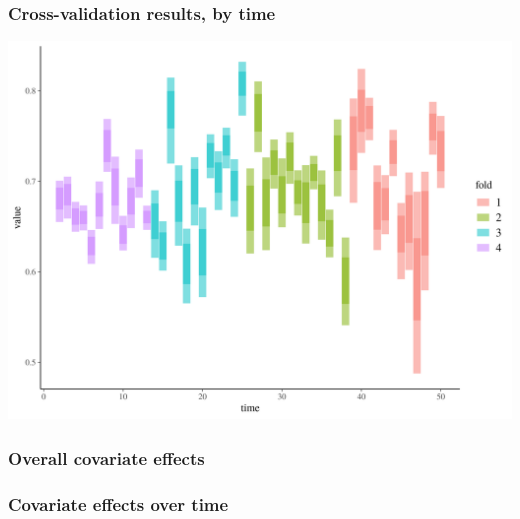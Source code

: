 \documentclass{beamer}
\begin{document}
\begin{frame}
  \frametitle{Cross-validation results, by time}
  
  \includegraphics[width=\textwidth,height=\textheight,keepaspectratio=true]{../results/figure/fold_auc_time}

\end{frame}


\begin{frame}
  \frametitle{Overall covariate effects}  

\end{frame}


\begin{frame}
  \frametitle{Covariate effects over time}  

\end{frame}
\end{document}
